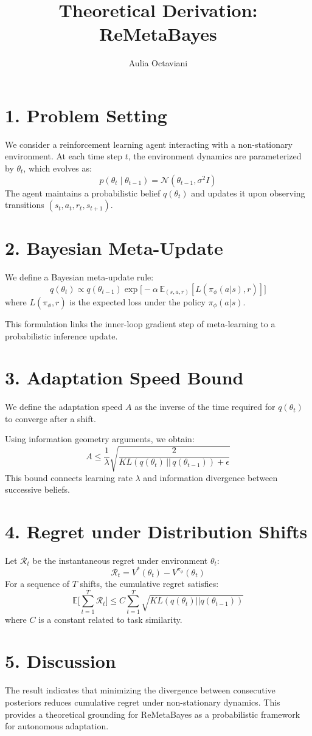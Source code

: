 \documentclass[a4paper,11pt]{article}
\title{Theoretical Derivation: ReMetaBayes}
\author{Aulia Octaviani}
\date{}
\begin{document}
\maketitle

\section*{1. Problem Setting}

We consider a reinforcement learning agent interacting with a non-stationary environment.
At each time step $t$, the environment dynamics are parameterized by $\theta_t$, which evolves as:
\[
p(\theta_t \mid \theta_{t-1}) = \mathcal{N}(\theta_{t-1}, \sigma^2 I)
\]
The agent maintains a probabilistic belief $q(\theta_t)$ and updates it upon observing transitions $(s_t, a_t, r_t, s_{t+1})$.

\section*{2. Bayesian Meta-Update}

We define a Bayesian meta-update rule:
\[
q(\theta_t) \propto q(\theta_{t-1}) 
\exp\Big[-\alpha \, \mathbb{E}_{(s,a,r)} [L(\pi_\phi(a|s), r)]\Big]
\]
where $L(\pi_\phi, r)$ is the expected loss under the policy $\pi_\phi(a|s)$.

This formulation links the inner-loop gradient step of meta-learning to a probabilistic inference update.

\section*{3. Adaptation Speed Bound}

We define the adaptation speed $A$ as the inverse of the time required for $q(\theta_t)$ to converge after a shift.

Using information geometry arguments, we obtain:
\[
A \le \frac{1}{\lambda} 
\sqrt{\frac{2}{KL(q(\theta_t)\,||\,q(\theta_{t-1})) + \epsilon}}
\]
This bound connects learning rate $\lambda$ and information divergence between successive beliefs.

\section*{4. Regret under Distribution Shifts}

Let $\mathcal{R}_t$ be the instantaneous regret under environment $\theta_t$:
\[
\mathcal{R}_t = V^*(\theta_t) - V^{\pi_\phi}(\theta_t)
\]
For a sequence of $T$ shifts, the cumulative regret satisfies:
\[
\mathbb{E}\Big[\sum_{t=1}^T \mathcal{R}_t\Big] 
\le C \sum_{t=1}^T \sqrt{KL(q(\theta_t)||q(\theta_{t-1}))}
\]
where $C$ is a constant related to task similarity.

\section*{5. Discussion}

The result indicates that minimizing the divergence between consecutive posteriors 
reduces cumulative regret under non-stationary dynamics. 
This provides a theoretical grounding for ReMetaBayes as a probabilistic 
framework for autonomous adaptation.
\end{document}
